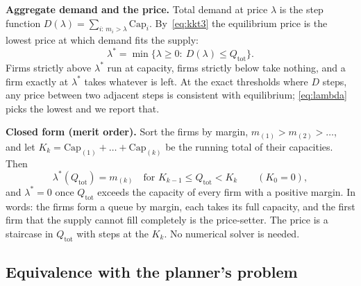 \documentclass[11pt]{article}
\begin{document}
\textbf{Aggregate demand and the price.} Total demand at price $\lambda$ is the
step function $D(\lambda)=\sum_{i:\,m_i>\lambda}\mathrm{Cap}_i$. By~\eqref{eq:kkt3}
the equilibrium price is the lowest price at which demand fits the supply:
\begin{equation}
\lambda^\ast=\min\{\lambda\ge0:\ D(\lambda)\le Q_{\mathrm{tot}}\}.
\label{eq:lambda}
\end{equation}
Firms strictly above $\lambda^\ast$ run at capacity, firms strictly below take
nothing, and a firm exactly at $\lambda^\ast$ takes whatever is left. At the exact
thresholds where $D$ steps, any price between two adjacent steps is consistent
with equilibrium; \eqref{eq:lambda} picks the lowest and we report that.

\textbf{Closed form (merit order).} Sort the firms by margin,
$m_{(1)}>m_{(2)}>\dots$, and let $K_k=\mathrm{Cap}_{(1)}+\dots+\mathrm{Cap}_{(k)}$ be
the running total of their capacities. Then
\begin{equation}
\lambda^\ast(Q_{\mathrm{tot}})=m_{(k)}\quad\text{for }K_{k-1}\le Q_{\mathrm{tot}}<K_k
\qquad(K_0=0),
\label{eq:closed}
\end{equation}
and $\lambda^\ast=0$ once $Q_{\mathrm{tot}}$ exceeds the capacity of every firm with
a positive margin. In words: the firms form a queue by margin, each takes its full
capacity, and the first firm that the supply cannot fill completely is the
price-setter. The price is a staircase in $Q_{\mathrm{tot}}$ with steps at the
$K_k$. No numerical solver is needed.

\subsection{Equivalence with the planner's problem}
\end{document}
